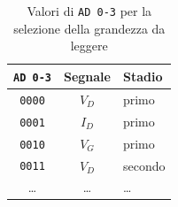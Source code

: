 \begin{table}[!htbp]
\begin{center}
\begin{tabular}{ c | c | p{4cm} }
\texttt{AD 0-3} & \textbf{Segnale} & \textbf{Stadio} \\
\hline 
\hline 
\texttt{0000} & $V_D$ & primo \\
\hline 
\texttt{0001} & $I_D$ & primo \\
\hline 
\texttt{0010} & $V_G$ & primo \\
\hline 
\texttt{0011} & $V_D$ & secondo \\
\dots & \dots & \dots \\
\hline
\end{tabular}
\caption{Valori di \texttt{AD 0-3} per la selezione della grandezza da leggere}
\label{tab:AD03}
\end{center}
\end{table}

